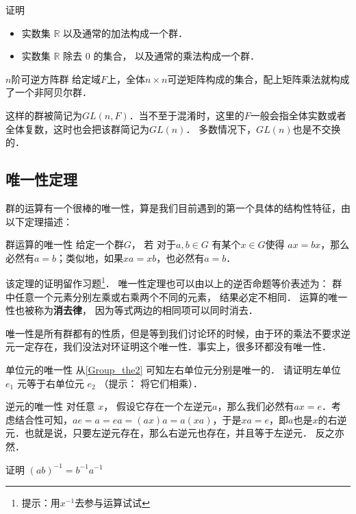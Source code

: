 \begin{exercise}{}
证明
\begin{itemize}
\item 实数集 $\mathbb R$ 以及通常的加法构成一个群．
\item 实数集 $\mathbb R$ 除去 $0$ 的集合， 以及通常的乘法构成一个群．
\end{itemize}
\end{exercise}

\begin{example}{$n$阶可逆方阵群}\label{Group_ex5}
给定域$F$上，全体$n\times n$可逆矩阵构成的集合，配上矩阵乘法就构成了一个非阿贝尔群．%

这样的群被简记为$GL(n, F)$．当不至于混淆时，这里的$F$一般会指全体实数或者全体复数，这时也会把该群简记为$GL(n)$． 多数情况下，$GL(n)$也是不交换的．
\end{example}

\subsection{唯一性定理}

群的运算有一个很棒的唯一性，算是我们目前遇到的第一个具体的结构性特征，由以下定理描述：

\begin{theorem}{群运算的唯一性}\label{Group_the2}
给定一个群$G$， 若 对于$ a, b\in G$ 有某个$x\in G$使得 $ax=bx$，那么必然有$a=b$；类似地，如果$xa=xb$，也必然有$a=b$．
\end{theorem}

该定理的证明留作习题\footnote{提示：用$x^{-1}$去参与运算试试}． 唯一性定理也可以由以上的逆否命题等价表述为： 群中任意一个元素分别左乘或右乘两个不同的元素， 结果必定不相同． 运算的唯一性也被称为\textbf{消去律}， 因为等式两边的相同项可以同时消去．

唯一性是所有群都有的性质，但是等到我们讨论环的时候，由于环的乘法不要求逆元一定存在，我们没法对环证明这个唯一性．事实上，很多环都没有唯一性．

\begin{exercise}{单位元的唯一性}
从\autoref{Group_the2} 可知左右单位元分别是唯一的． 请证明左单位 $e_1$ 元等于右单位元 $e_2$ （提示： 将它们相乘）．
\end{exercise}

\begin{theorem}{逆元的唯一性}\label{Group_the1}
对任意 $x$， 假设它存在一个左逆元$a$，那么我们必然有$ax=e$．考虑结合性可知，$ae=a=ea=(ax)a=a(xa)$，于是$xa=e$，即$a$也是$x$的右逆元．也就是说，只要左逆元存在，那么右逆元也存在，并且等于左逆元． 反之亦然．
\end{theorem}

\begin{exercise}{}
证明 $(ab)^{-1} = b^{-1}a^{-1}$
\end{exercise}
